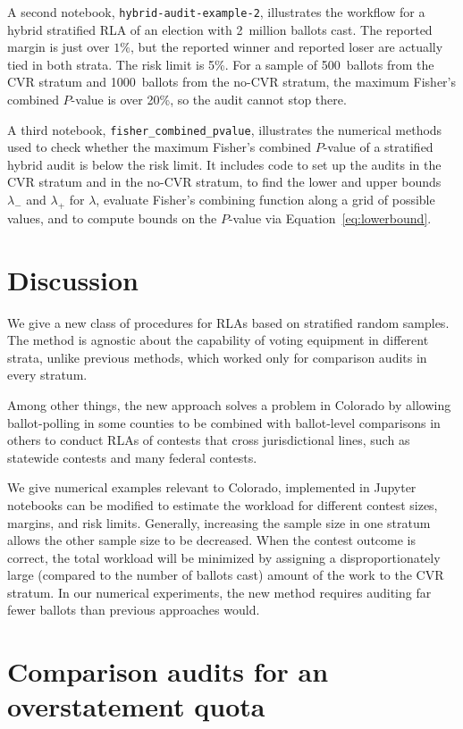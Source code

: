 \documentclass[runningheads]{llncs}
\begin{document}
A second notebook, \texttt{hybrid-audit-example-2}, illustrates the 
workflow for a hybrid stratified RLA of an election with 2~million ballots cast.
The reported margin is just over $1\%$, but the reported winner
and reported loser are actually tied in both strata.  
The risk limit is 5\%.
For a sample of 500~ballots from the CVR stratum and 1000~ballots from the no-CVR stratum, the maximum Fisher's combined $P$-value is over 20\%, so the audit cannot stop there.

A third notebook, \texttt{fisher\_combined\_pvalue}, illustrates the numerical methods used
to check whether the maximum Fisher's combined $P$-value of a stratified hybrid audit is below the risk limit.
It includes code to set up the audits in the CVR stratum and in the no-CVR stratum,
 to find the lower and upper bounds $\lambda_-$ and $\lambda_+$ for $\lambda$,
 evaluate Fisher's combining function along a grid of possible values,
and to compute bounds on the $P$-value via Equation~\ref{eq:lowerbound}.

\section{Discussion} \label{sec:discussion}

We give a new class of procedures for RLAs based on stratified random samples.
The method is agnostic about the capability of voting equipment in different strata, unlike
previous methods, which worked only for comparison audits in every stratum.

Among other things, the new approach solves a problem in Colorado by allowing ballot-polling in some counties to be combined with ballot-level comparisons in others to conduct RLAs of contests that cross jurisdictional lines, such as statewide contests and many federal contests.

We give numerical examples relevant to Colorado, implemented in Jupyter notebooks can be modified to estimate the workload for different contest sizes, margins, and risk limits.
Generally, increasing the sample size in one stratum allows the other sample size to be decreased.
When the contest outcome is correct, the total workload will be minimized by 
assigning a disproportionately large (compared to the number of ballots cast) amount of 
the work to the CVR stratum.
In our numerical experiments, the new method requires auditing far fewer ballots than previous approaches would. 

\appendix
\section{Comparison audits for an overstatement quota}\label{sec:appendix-comparison}
\end{document}
